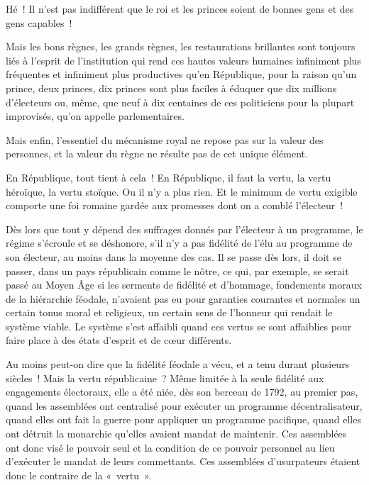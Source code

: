 \documentclass[french,twoside]{book} %
\newcommand{\astermono}{\medskip\centerline{\color{rubric}\large\selectfont{\syms ✻}}\medskip\par}%
\begin{document}
\astermono

\noindent Hé ! Il n’est pas indifférent que le roi et les princes soient de bonnes gens et des gens capables !\par
Mais les bons règnes, les grands règnes, les restaurations brillantes sont toujours liés à l’esprit de l’institution qui rend ces hautes valeurs humaines infiniment plus fréquentes et infiniment plus productives qu’en République, pour la raison qu’un prince, deux princes, dix princes sont plus faciles à éduquer que dix millions d’électeurs ou, même, que neuf à dix centaines de ces politiciens pour la plupart improvisés, qu’on appelle parlementaires.\par
Mais enfin, l’essentiel du mécanisme royal ne repose pas sur la valeur des personnes, et la valeur du règne ne résulte pas de cet unique élément.\par
En République, tout tient à cela ! En République, il faut la vertu, la vertu héroïque, la vertu stoïque. Ou il n’y a plus rien. Et le minimum de vertu exigible comporte une foi romaine gardée aux promesses dont on a comblé l’électeur !\par
Dès lors que tout y dépend des suffrages donnés par l’électeur à un programme, le régime s’écroule et se déshonore, s’il n’y a pas fidélité de l’élu au programme de son électeur, au moins dans la moyenne des cas. Il se passe dès lors, il doit se passer, dans un pays républicain comme le nôtre, ce qui, par exemple, se serait passé au Moyen Âge si les serments de fidélité et d’hommage, fondements moraux de la hiérarchie féodale, n’avaient pas eu pour garanties courantes et normales un certain tonus moral et religieux, un certain sens de l’honneur qui rendait le système viable. Le système s’est affaibli quand ces vertus se sont affaiblies pour faire place à des états d’esprit et de cœur différents.\par
Au moins peut-on dire que la fidélité féodale a vécu, et a tenu durant plusieurs siècles ! Mais la vertu républicaine ? Même limitée à la seule fidélité aux engagements électoraux, elle a été niée, dès son berceau de 1792, au premier pas, quand les assemblées ont centralisé pour exécuter un programme décentralisateur, quand elles ont fait la guerre pour appliquer un programme pacifique, quand elles ont détruit la monarchie qu’elles avaient mandat de maintenir. Ces assemblées ont donc visé le pouvoir seul et la condition de ce pouvoir personnel au lieu d’exécuter le mandat de leurs commettants. Ces assemblées d’usurpateurs étaient donc le contraire de la « vertu ».\par
\end{document}
